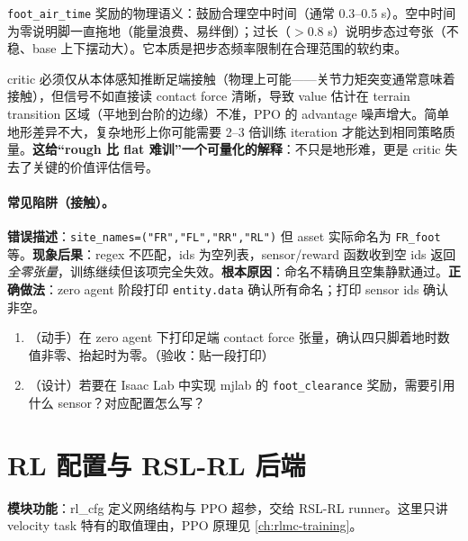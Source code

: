 \verb|foot_air_time| 奖励的物理语义：鼓励合理空中时间（通常 0.3--0.5 s）。空中时间为零说明脚一直拖地（能量浪费、易绊倒）；过长（$>0.8$ s）说明步态过夸张（不稳、base 上下摆动大）。它本质是把步态频率限制在合理范围的软约束。

\begin{insight}\label{ins:rlmc-ql-nocontact}
critic 必须仅从本体感知推断足端接触（物理上可能——关节力矩突变通常意味着接触），但信号不如直接读 contact force 清晰，导致 value 估计在 terrain transition 区域（平地到台阶的边缘）不准，PPO 的 advantage 噪声增大。简单地形差异不大，复杂地形上你可能需要 2--3 倍训练 iteration 才能达到相同策略质量。\textbf{这给“rough 比 flat 难训”一个可量化的解释}：不只是地形难，更是 critic 失去了关键的价值评估信号。
\end{insight}

\paragraph{常见陷阱（接触）。}

\begin{pitfall}
\textbf{错误描述}：\verb|site_names=("FR","FL","RR","RL")| 但 asset 实际命名为 \verb|FR_foot| 等。\textbf{现象后果}：regex 不匹配，ids 为空列表，sensor/reward 函数收到空 ids 返回\emph{全零张量}，训练继续但该项完全失效。\textbf{根本原因}：命名不精确且空集静默通过。\textbf{正确做法}：zero agent 阶段打印 \verb|entity.data| 确认所有命名；打印 sensor ids 确认非空。
\end{pitfall}

\begin{practice}[接触传感]
\begin{enumerate}
\item （动手）在 zero agent 下打印足端 contact force 张量，确认四只脚着地时数值非零、抬起时为零。（验收：贴一段打印）
\item （设计）若要在 Isaac Lab 中实现 mjlab 的 \verb|foot_clearance| 奖励，需要引用什么 sensor？对应配置怎么写？
\end{enumerate}
\end{practice}

\section{RL 配置与 RSL-RL 后端}
\label{sec:rlmc-ql-rlcfg}

\textbf{模块功能}：rl\_cfg 定义网络结构与 PPO 超参，交给 RSL-RL runner。这里只讲 velocity task 特有的取值理由，PPO 原理见 \cref{ch:rlmc-training}。

